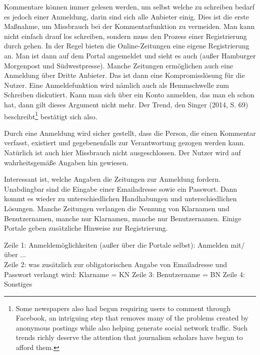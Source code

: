 
Kommentare können immer gelesen werden, um selbst welche zu schreiben bedarf es
jedoch einer Anmeldung, darin sind sich alle Anbieter einig. Dies ist die erste
Maßnahme, um Missbrauch bei der Kommentarfunktion zu vermeiden. Man kann nicht
einfach drauf los schreiben, sondern muss den Prozess einer Registrierung durch
gehen. In der Regel bieten die Online-Zeitungen eine eigene Registrierung an.
Man ist dann auf dem Portal angemeldet und sieht es auch (außer Hamburger
Morgenpost und Südwestpresse). Manche Zeitungen ermöglichen auch eine Anmeldung
über Dritte Anbieter. Das ist dann eine Kompromisslösung für die Nutzer. Eine
Anmeldefunktion wird nämlich auch als Hemmschwelle zum Schreiben diskutiert.
Kann man sich über ein Konto anmelden, das man eh schon hat, dann gilt dieses
Argument nicht mehr. Der Trend, den Singer (2014, S. 69)
beschreibt\footnote{\glqq Some newspapers also had begun requiring users to
comment through Facebook, an intriguing step that removes many of the problems
created by anonymous postings while also helping generate social network
traffic. Such trends richly deserve the attention that journalism scholars have
begun to afford them.\grqq} bestätigt sich also.

Durch eine Anmeldung wird sicher gestellt, dass die Person, die einen Kommentar
verfasst, existiert und gegebenenfalls zur Verantwortung gezogen werden kann.
Natürlich ist auch hier Missbrauch nicht ausgeschlossen. Der Nutzer wird auf
wahrheitsgemäße Angaben hin gewiesen. 

Interessant ist, welche Angaben die Zeitungen zur Anmeldung fordern. Unabdingbar
sind die Eingabe einer Emailadresse sowie ein Passwort. Dann kommt es wieder zu
unterschiedlichen Handhabungen und unterschiedlichen Lösungen. Manche Zeitungen
verlangen die Nennung von Klarnamen und Benutzernamen, manche nur Klarnamen,
manche nur Benutzernamen. Einige Portale geben zusätzliche Hinweise zur
Registrierung. 

Zeile 1: Anmeldemöglichkeiten (außer über die Portale selbst): Anmelden mit/über ... \\
Zeile 2: was zusätzlich zur obligatorischen Angabe von Emailadresse und Passwort verlangt wird: Klarname = KN
Zeile 3: Benutzername = BN
Zeile 4: Sonstiges

